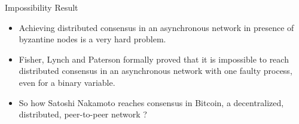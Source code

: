 \documentclass[usenames,dvipsnames]{beamer}
\begin{document}
        \begin{frame}{Impossibility Result}
            
            \begin{itemize}
                \item Achieving \alert{distributed consensus} in an asynchronous network in presence of byzantine nodes is a very \alert{hard problem}.
                \item Fisher, Lynch and Paterson \cite{Fischer:1985:IDC:3149.214121} formally proved that it is \alert{impossible} to reach distributed consensus in an asynchronous network with \alert{one faulty process}, even for a \alert{binary} variable.
                \item So how Satoshi Nakamoto reaches consensus in \alert{Bitcoin}, a decentralized, distributed, peer-to-peer network ?
            \end{itemize}
            
        
        
        
            
            
        \end{frame}
    
\end{document}
